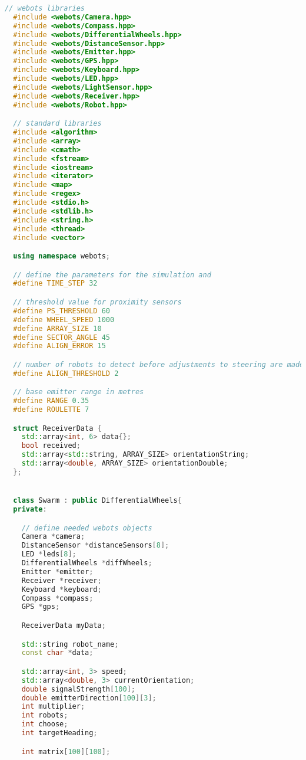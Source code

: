 \begin{lstlisting}[language=C++, caption={swarm.hpp},label={lst:swarm-header}]
  // webots libraries
  #include <webots/Camera.hpp>
  #include <webots/Compass.hpp>
  #include <webots/DifferentialWheels.hpp>
  #include <webots/DistanceSensor.hpp>
  #include <webots/Emitter.hpp>
  #include <webots/GPS.hpp>
  #include <webots/Keyboard.hpp>
  #include <webots/LED.hpp>
  #include <webots/LightSensor.hpp>
  #include <webots/Receiver.hpp>
  #include <webots/Robot.hpp>

  // standard libraries
  #include <algorithm>
  #include <array>
  #include <cmath>
  #include <fstream>
  #include <iostream>
  #include <iterator>
  #include <map>
  #include <regex>
  #include <stdio.h>
  #include <stdlib.h>
  #include <string.h>
  #include <thread>
  #include <vector>

  using namespace webots;

  // define the parameters for the simulation and
  #define TIME_STEP 32

  // threshold value for proximity sensors
  #define PS_THRESHOLD 60
  #define WHEEL_SPEED 1000
  #define ARRAY_SIZE 10
  #define SECTOR_ANGLE 45
  #define ALIGN_ERROR 15

  // number of robots to detect before adjustments to steering are made
  #define ALIGN_THRESHOLD 2

  // base emitter range in metres
  #define RANGE 0.35
  #define ROULETTE 7

  struct ReceiverData {
    std::array<int, 6> data{};
    bool received;
    std::array<std::string, ARRAY_SIZE> orientationString;
    std::array<double, ARRAY_SIZE> orientationDouble;
  };


  class Swarm : public DifferentialWheels{
  private:

    // define needed webots objects
    Camera *camera;
    DistanceSensor *distanceSensors[8];
    LED *leds[8];
    DifferentialWheels *diffWheels;
    Emitter *emitter;
    Receiver *receiver;
    Keyboard *keyboard;
    Compass *compass;
    GPS *gps;

    ReceiverData myData;

    std::string robot_name;
    const char *data;

    std::array<int, 3> speed;
    std::array<double, 3> currentOrientation;
    double signalStrength[100];
    double emitterDirection[100][3];
    int multiplier;
    int robots;
    int choose;
    int targetHeading;

    int matrix[100][100];


\end{lstlisting}
